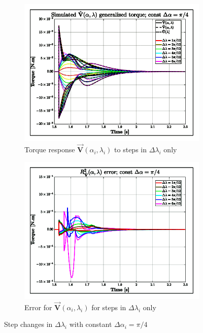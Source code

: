 \begin{figure}[htbp]
\vspace{-10pt}
\centering
\begin{subfigure}{0.49\textwidth}
\centering
\includegraphics[width=\textwidth]{graphs/tau-comb-lam}
\caption{Torque response $\vec{\mathbf{V}}(\alpha_i,\lambda_i)$ to steps in $\Delta\lambda_i$ only}
\label{fig:tau-comb-lam}
\end{subfigure}
\begin{subfigure}{0.49\textwidth}
\centering
\includegraphics[width=\textwidth]{graphs/tau-comb-lam-r}
\caption{Error for $\vec{\mathbf{V}}(\alpha_i,\lambda_i)$ for steps in $\Delta\lambda_i$ only}
\label{fig:tau-comb-lam-r}
\end{subfigure}
\vspace{-6pt}
\caption{Step changes in $\Delta\lambda_i$ with constant $\Delta\alpha_i=\pi/4$}
\label{fig:tau-com-lambda}
\vspace{-16pt}
\end{figure}
